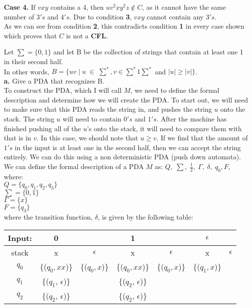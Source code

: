 \documentclass[12pt]{article}
\begin{document}
\textbf{Case 4.} If $vxy$ contains a 4, then $u v^2 x y^2 z \notin C$, as it cannot
have the same number of $3's$ and $4's$. Due to condition \textbf{3}, $vxy$ cannot
contain any $3's$. \\

As we can see from condition \textbf{2}, this contradicts condition \textbf{1}
in every case shown which proves that $C$ is not a \textbf{CFL}.

 Let $\sum = \{0, 1\}$ and let B be the collection of strings that contain at least one 1 in
their second half. \\
In other words, $B = \{uv \; | \; u \; \in \; \sum^*, v \in \sum^*1\sum^*$ and $|u| \geq |v|\} $. \\

\textbf{a.} Give a PDA that recognizes B. \\

To construct the PDA, which I will call $M$, we need to define the formal
description and determine how we will create the PDA. To start out,
we will need to make sure that this PDA reads the string in, and pushes
the string $u$ onto the stack. The string $u$ will need to contain $0's$
and $1's$. After the machine has finished pushing all of the $u$'s onto
the stack, it will need to compare them with that is in $v$. In this case,
we should note that $u \geq v$. If we find that the amount of $1's$ in
the input is at least one in the second half, then we can accept the string
entirely. We can do this using a non deterministic PDA (push down automata). \\

We can define the formal description of a PDA $M$ as:
$Q, \; \sum, \; \frac{1}{2}, \; \Gamma, \; \delta, \; q_0, F $, where: \\

$Q = \{q_0, q_1, q_2, q_3\}$ \\
$\sum = \{0, 1 \}$ \\
$\Gamma = \{ x \}$ \\
$F = \{ q_3 \}$ \\

where the transition function, $\delta$,  is given by the following table: \\

\begin{tabularx}{\textwidth}{ c | c c | c c | c c }
Input: & 0 & & 1 & & $\epsilon$ \\
\hline
stack & x & $\epsilon$ & x & $\epsilon$ & x & $\epsilon$ \\
\hline
$q_0$ & \{($q_0, xx$)\} & \{($q_0, x$)\} & \{($q_0, xx$)\} & \{($q_0, x$)\}
& \{($q_1, x$)\} & \\
\hline
$q_1$ & \{($q_1$, $\epsilon$)\} & & \{($q_2$, $\epsilon$)\} & & & \\
\hline
$q_2$ & \{($q_2$, $\epsilon$)\} & & \{($q_2$, $\epsilon$)\} & & & \\
\end{tabularx} \\
\end{document}
